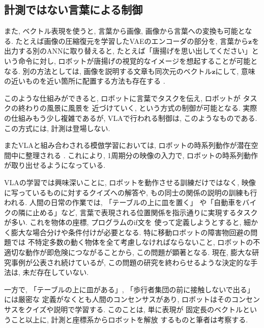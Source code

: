 \documentclass[twocolumn]{jarticle} %
\newcommand{\V}[1]{\boldsymbol{#1}}
\begin{document}
%

\subsection{計測ではない言葉による制御}

また, ベクトル表現を使うと, 
言葉から画像, 画像から言葉への変換も可能となる. 
たとえば画像の圧縮復元を学習したVAEのエンコーダの部分を, 
言葉から$\V{z}$を出力する別のANNに取り替えると, 
たとえば「唐揚げを思い出してください」という命令に対し, 
ロボットが唐揚げの視覚的なイメージを想起することが可能となる. 
別の方法としては, 
画像を説明する文章も同次元のベクトル$\V{z}$にして, 
意味の近いものを近い箇所に配置する方法も存在する
\cite{radford2021}. 

このような仕組みができると, 
ロボットに言葉でタスクを伝え, 
ロボットが タスクの終わりの風景に風景を
近づけていく, という方式の制御が可能となる. 
実際の仕組みもう少し複雑であるが, 
VLAで行われる制御は, このようなものである. 
この方式には, 計測は登場しない. 

またVLAと組み合わされる模倣学習においては, 
ロボットの時系列動作が潜在空間中に整理される
\cite{zhao2023,black2024}. 
これにより, 1周期分の映像の入力で, 
ロボットの時系列動作が取り出せるようになっている. 

VLAの学習では興味深いことに,
ロボットを動作させる訓練だけではなく, 
映像に写っているものに対するクイズへの解答や, 
もの同士の関係の説明の訓練も行われる\cite{brohan2023}. 
人間の日常の作業では, 「テーブルの上に皿を置く」
や「自動車をバイクの隣に止める」など, 
言葉で表現される位置関係を指示通りに実現するタスクが多い. 
これを物体の座標, プログラムのif文を
使って定義しようとすると, 
細かく膨大な場合分けや条件付けが必要となる. 
特に移動ロボットの障害物回避の問題では
不特定多数の動く物体を全て考慮しなければならないこと, 
ロボットの不適切な動作が即危険につながることから, 
この問題が顕著となる. 
現在, 膨大な研究事例が公表され続けているが, 
この問題の研究を終わらせるような決定的な手法は, 
未だ存在していない. 


一方で, 「テーブルの上に皿がある」, 
「歩行者集団の前に接触しないで出る」には厳密な
定義がなくとも人間のコンセンサスがあり, 
ロボットはそのコンセンサスをクイズや説明で学習する. 
このことは, 単に表現が
固定長のベクトルということ以上に, 
計測と座標系からロボットを解放
するものと筆者は考察する. 
\end{document}
